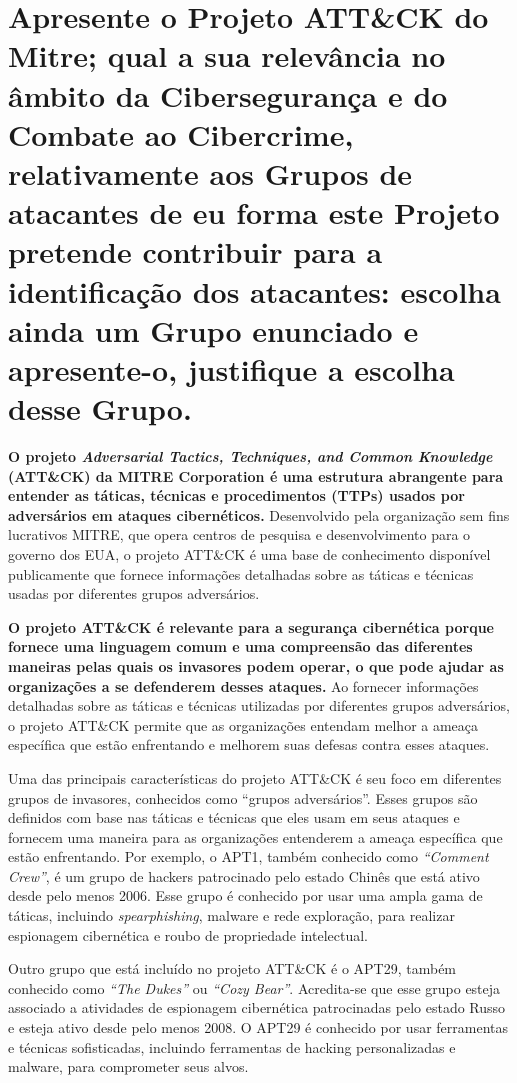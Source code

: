 \section[Pergunta 2]{Apresente o Projeto ATT\&CK do Mitre; qual a sua relevância no âmbito da Cibersegurança e do Combate ao Cibercrime, relativamente aos Grupos de atacantes de eu forma este Projeto pretende contribuir para a identificação dos atacantes: escolha ainda um Grupo enunciado e apresente-o, justifique a escolha desse Grupo.}

\textbf{O projeto \textit{Adversarial Tactics, Techniques, and Common Knowledge} (ATT\&CK) da MITRE Corporation é uma estrutura abrangente para entender as táticas, técnicas e procedimentos (TTPs) usados por adversários em ataques cibernéticos.} Desenvolvido pela organização sem fins lucrativos MITRE, que opera centros de pesquisa e desenvolvimento para o governo dos EUA, o projeto ATT\&CK é uma base de conhecimento disponível publicamente que fornece informações detalhadas sobre as táticas e técnicas usadas por diferentes grupos adversários.

\textbf{O projeto ATT\&CK é relevante para a segurança cibernética porque fornece uma linguagem comum e uma compreensão das diferentes maneiras pelas quais os invasores podem operar, o que pode ajudar as organizações a se defenderem desses ataques.} Ao fornecer informações detalhadas sobre as táticas e técnicas utilizadas por diferentes grupos adversários, o projeto ATT\&CK permite que as organizações entendam melhor a ameaça específica que estão enfrentando e melhorem suas defesas contra esses ataques.

Uma das principais características do projeto ATT\&CK é seu foco em diferentes grupos de invasores, conhecidos como ``grupos adversários''. Esses grupos são definidos com base nas táticas e técnicas que eles usam em seus ataques e fornecem uma maneira para as organizações entenderem a ameaça específica que estão enfrentando. Por exemplo, o APT1, também conhecido como \textit{``Comment Crew''}, é um grupo de hackers patrocinado pelo estado Chinês que está ativo desde pelo menos 2006. Esse grupo é conhecido por usar uma ampla gama de táticas, incluindo \textit{spearphishing}, malware e rede exploração, para realizar espionagem cibernética e roubo de propriedade intelectual.

Outro grupo que está incluído no projeto ATT\&CK é o APT29, também conhecido como \textit{``The Dukes''} ou \textit{``Cozy Bear''}. Acredita-se que esse grupo esteja associado a atividades de espionagem cibernética patrocinadas pelo estado Russo e esteja ativo desde pelo menos 2008. O APT29 é conhecido por usar ferramentas e técnicas sofisticadas, incluindo ferramentas de hacking personalizadas e malware, para comprometer seus alvos.

